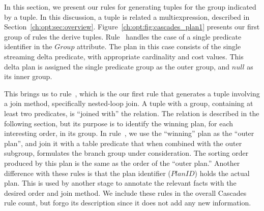 In this section, we present our rules for generating  tuples for the
group indicated by a  tuple.  In this discussion, a  tuple
is related a multiexpression, described in Section~\ref{ch:opt:sec:overview}.
Figure~\ref{ch:opt:fig:cascades_plan1} presents our first group of rules the
derive  tuples.  Rule~ handles the case of a single predicate
identifier in the $Group$ attribute.  The plan in this case consists of the
single streaming delta predicate, with appropriate cardinality and cost values.
This delta plan is assigned the single predicate group as the outer group, and
$null$ as its inner group.

This brings us to rule~, which is the our first rule that generates a
 tuple involving a join method, specifically nested-loop join.  A
 tuple with a group, containing at least two predicates, is ``joined
with'' the  relation.  The  relation is described in the
following section, but its purpose is to identify the winning plan, for each
interesting order, in its group.  In rule~, we use the ``winning'' plan
as the ``outer plan'', and join it with a table predicate that when combined
with the outer subgroup, formulates the branch group under consideration.  The
sorting order produced by this plan is the same as the order of the ``outer
plan.'' Another difference with these rules is that the plan identifier
($PlanID$) holds the actual plan.  This is used by another stage to annotate
the relevant  facts with the desired order and join method.
We include these rules in the overall Cascades rule count, but forgo its
description since it does not add any new information.

